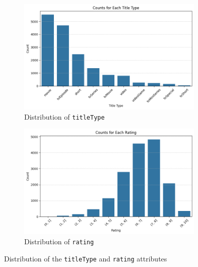 \begin{figure}[H]
    \centering
    \begin{subfigure}{0.49\textwidth}
        \centering
        \includegraphics[width=0.98\textwidth]{plots/types_count.png}     %
        \caption{Distribution of \texttt{titleType}}
        \captionsetup{width=0.9\linewidth, justification=centering}
        \label{fig:titleType_distrib}
    \end{subfigure}
    \begin{subfigure}{0.49\textwidth}
        \centering
        \includegraphics[width=0.98\textwidth]{plots/rating_distrib.png}     %
        \caption{Distribution of \texttt{rating}}
        \captionsetup{width=0.9\linewidth, justification=centering}
        \label{fig:rating_distrib}
    \end{subfigure}
    \captionsetup{justification=centering}
    \caption{Distribution of the \texttt{titleType} and \texttt{rating} attributes}
    \label{fig:distrib}
\end{figure}

